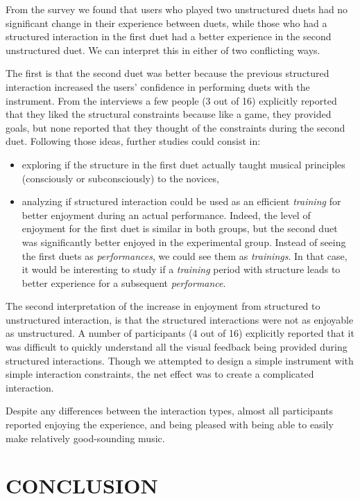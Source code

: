 \documentclass{article}
\begin{document}
From the survey we found that users who played two unstructured duets had no significant change in their experience between duets, while those who had a structured interaction in the first duet had a better experience in the second unstructured duet. We can interpret this in either of two conflicting ways.

The first is that the second duet was better because the previous structured interaction increased the users' confidence in performing duets with the instrument. From the interviews a few people (3 out of 16) explicitly reported that they liked the structural constraints because like a game, they provided goals, but none reported that they thought of the constraints during the second duet. Following those ideas, 
further studies could consist in:
\begin{itemize}
\item exploring if the structure in the first duet actually taught musical principles (consciously or subconsciously) to the novices,
\item analyzing if structured interaction could be used as an efficient \textit{training} for better enjoyment during an actual performance. Indeed, the level of enjoyment for the first duet is similar in both groups, but the second duet was significantly better enjoyed in the experimental group. Instead of seeing the first duets as \textit{performances}, we could see them as \textit{trainings}. In that case, it would be interesting to study if a \textit{training} period with structure leads to better experience for a subsequent \textit{performance}.
\end{itemize}

The second interpretation of the increase in enjoyment from structured to unstructured interaction, is that the structured interactions were not as enjoyable as unstructured.  A number of participants (4 out of 16) explicitly reported that it was difficult to quickly understand all the visual feedback being provided during structured interactions.  Though we attempted to design a simple instrument with simple interaction constraints, the net effect was to create a complicated interaction.

Despite any differences between the interaction types, almost all participants reported enjoying the experience, and being pleased with being able to easily make relatively good-sounding music.




\section{CONCLUSION}
\end{document}

